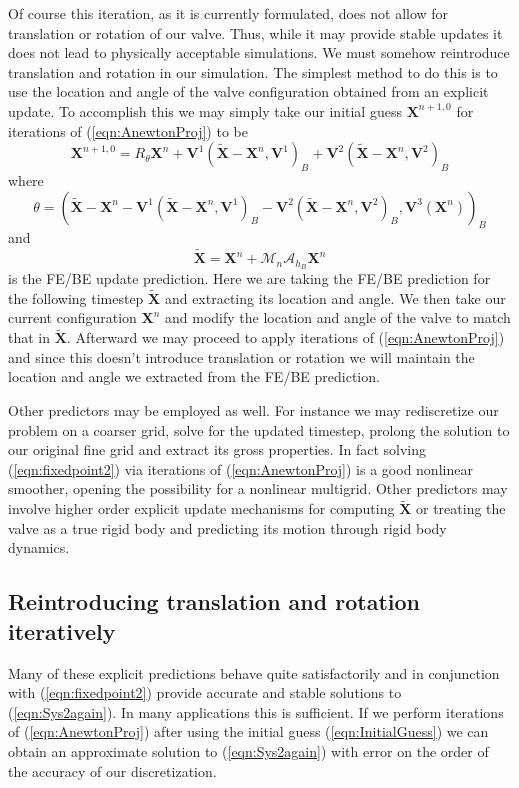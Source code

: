 \documentclass[preprint,12pt]{elsarticle}
\begin{document}
Of course this iteration, as it is currently formulated, does not allow for translation or rotation of our valve. Thus, while it may provide stable updates it does not lead to physically acceptable simulations. We must somehow reintroduce translation and rotation in our simulation.
The simplest method to do this is to use the location and angle of the valve configuration obtained from an explicit update. To accomplish this we may simply take our initial guess $\mathbf{X}^{n+1,0}$ for iterations of (\ref{eqn:AnewtonProj}) to be
\begin{equation}
\mathbf{X}^{n+1,0} = R_{\theta}\mathbf{X}^n + \mathbf{V}^1(\tilde{\mathbf{X}}-\mathbf{X}^n,\mathbf{V}^1)_B
+ \mathbf{V}^2(\tilde{\mathbf{X}}-\mathbf{X}^n,\mathbf{V}^2)_B
\label{eqn:InitialGuess}
\end{equation}
where
\begin{equation}
\theta = (\tilde{\mathbf{X}}-\mathbf{X}^n
-\mathbf{V}^1(\tilde{\mathbf{X}}-\mathbf{X}^n,\mathbf{V}^1)_B
-\mathbf{V}^2(\tilde{\mathbf{X}}-\mathbf{X}^n,\mathbf{V}^2)_B
,\mathbf{V}^3(\mathbf{X}^n))_B
\end{equation}
and
\begin{equation}
\tilde{\mathbf{X}} = \mathbf{X}^n + \mathcal{M}_n\mathcal{A}_{h_B}\mathbf{X}^n
\end{equation}
is the FE/BE update prediction. Here we are taking the FE/BE prediction for the following timestep $\tilde{\mathbf{X}}$ and extracting its location and angle. We then take our current configuration $\mathbf{X}^n$ and modify the location and angle of the valve to match that in $\tilde{\mathbf{X}}$. Afterward we may proceed to apply iterations of (\ref{eqn:AnewtonProj}) and since this doesn't introduce translation or rotation we will maintain the location and angle we extracted from the FE/BE prediction.

Other predictors may be employed as well. 
For instance we may rediscretize our problem on a coarser grid, solve for the updated timestep, prolong the solution to our original fine grid and extract its gross properties. In fact solving (\ref{eqn:fixedpoint2}) via iterations of (\ref{eqn:AnewtonProj}) is a good nonlinear smoother, opening the possibility for a nonlinear multigrid. Other predictors may involve higher order explicit update mechanisms for computing $\tilde{\mathbf{X}}$ or treating the valve as a true rigid body and predicting its motion through rigid body dynamics.

\subsection{Reintroducing translation and rotation iteratively}
Many of these explicit predictions behave quite satisfactorily and in conjunction with (\ref{eqn:fixedpoint2}) provide accurate and stable solutions to (\ref{eqn:Sys2again}). In many applications this is sufficient. If we perform iterations of (\ref{eqn:AnewtonProj}) after using the initial guess (\ref{eqn:InitialGuess}) we can obtain an approximate solution to (\ref{eqn:Sys2again}) with error on the order of the accuracy of our discretization.
\end{document}
